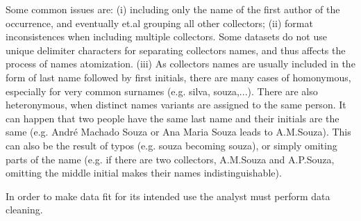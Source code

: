 

Some common issues are: (i) including only the name of the first author of the occurrence, and eventually et.al grouping all other collectors;
(ii) format inconsistences when including multiple collectors. Some datasets do not use unique delimiter characters for separating collectors names, and thus affects the process of names atomization.
(iii) As collectors names are usually included in the form of last name followed by first initials, there are many cases of homonymous, especially for very common surnames (e.g. silva, souza,...).
There are also heteronymous, when distinct names variants are assigned to the same person. It can happen that two people have the same last name and their initials are the same (e.g. André Machado Souza or Ana Maria Souza leads to A.M.Souza).
This can also be the result of typos (e.g. souza becoming souza), or simply omiting parts of the name (e.g. if there are two collectors, A.M.Souza and A.P.Souza, omitting the middle initial makes their names indistinguishable).


In order to make data fit for its intended use the analyst must perform data cleaning.



